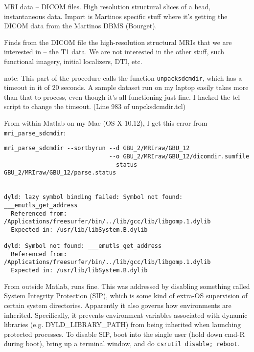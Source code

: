 \documentclass[11pt]{article}
\begin{document}
\begin{itemize}

MRI data -- DICOM files. High resolution structural slices of a
  head, instantaneous data.  Import is Martinos specific stuff where
  it's getting the DICOM data from the Martinos DBMS (Bourget).

 Finds from the DICOM file 
the high-resolution structural MRIs
  that we are interested in -- the T1 data.  We are not interested in the other
  stuff, such functional imagery, initial localizers, DTI, etc.

  note: This part of the procedure calls the \fs function
  \verb+unpacksdcmdir+, which has a timeout in it of 20 seconds.  A
  sample dataset run on my laptop easily takes more than that to
  process, even though it's all functioning just fine.  I hacked the
  tcl script to change the timeout. (Line 983 of unpcksdcmdir.tcl)

From within Matlab on my Mac (OS X 10.12), I get this error from \verb+mri_parse_sdcmdir+:

\begin{verbatim}
mri_parse_sdcmdir --sortbyrun --d GBU_2/MRIraw/GBU_12 
                              --o GBU_2/MRIraw/GBU_12/dicomdir.sumfile 
                              --status GBU_2/MRIraw/GBU_12/parse.status


dyld: lazy symbol binding failed: Symbol not found: ___emutls_get_address
  Referenced from: /Applications/freesurfer/bin/../lib/gcc/lib/libgomp.1.dylib
  Expected in: /usr/lib/libSystem.B.dylib

dyld: Symbol not found: ___emutls_get_address
  Referenced from: /Applications/freesurfer/bin/../lib/gcc/lib/libgomp.1.dylib
  Expected in: /usr/lib/libSystem.B.dylib
\end{verbatim}

From outside Matlab, runs fine.  This was addressed by disabling
something called System Integrity Protection (SIP), which is some kind
of extra-OS supervision of certain system directories.  Apparently it
also governs how environments are inherited.  Specifically, it
prevents environment variables associated with dynamic libraries
(e.g. DYLD\_LIBRARY\_PATH) from being inherited when launching
protected processes.  To disable SIP, boot into the single user (hold
down cmd-R during boot), bring up a terminal window, and do
\verb+csrutil disable; reboot+.
  


\end{itemize}
\end{document}
